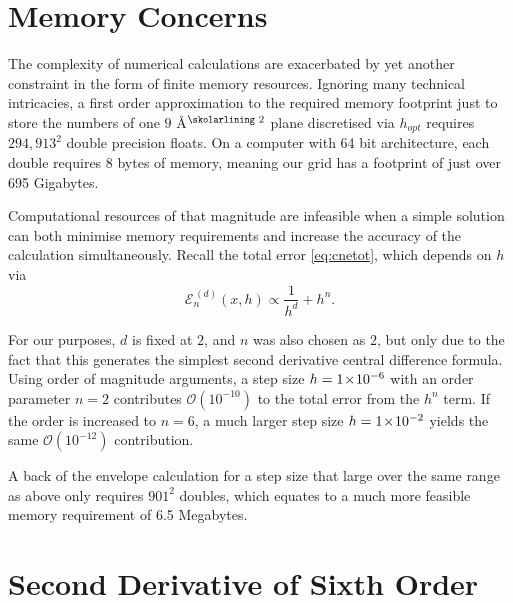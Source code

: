 \section{Memory Concerns}\label{sec:memcons}

The complexity of numerical calculations are exacerbated by yet another constraint in the form of finite memory resources.
Ignoring many technical intricacies, a first order approximation to the required memory footprint just to store the numbers of one $9$ Å$^\text{\skolarlining 2}$ plane discretised via $h_{opt}$ requires $294,913^2$ double precision floats.
On a computer with 64 bit architecture, each double requires 8 bytes of memory, meaning our grid has a footprint of just over 695 Gigabytes.

Computational resources of that magnitude are infeasible when a simple solution can both minimise memory requirements and increase the accuracy of the calculation simultaneously.
Recall the total error \cref{eq:cnetot}, which depends on $h$ via
\begin{equation}
\mathcal{E}_n^{\,(d)}(x,h) \propto \frac{1}{h^d} + h^n.
\end{equation}

For our purposes, $d$ is fixed at $2$, and $n$ was also chosen as $2$, but only due to the fact that this generates the simplest second derivative central difference formula.
Using order of magnitude arguments, a step size $h = 1\!\times\!10^{-6}$ with an order parameter $n = 2$ contributes $\mathcal{O}(10^{-10})$ to the total error from the $h^n$ term.
If the order is increased to $n = 6$, a much larger step size $h = 1\!\times\!10^{-2}$ yields the same $\mathcal{O}(10^{-12})$ contribution.

A back of the envelope calculation for a step size that large over the same range as above only requires $901^2$ doubles, which equates to a much more feasible memory requirement of 6.5 Megabytes.

\section{Second Derivative of Sixth Order}\label{sec:cd6o}

